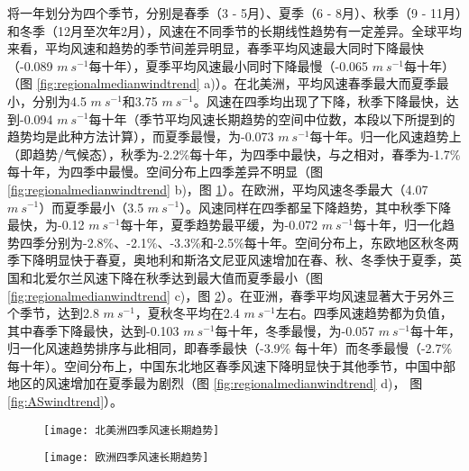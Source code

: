 将一年划分为四个季节，分别是春季（3 - 5月）、夏季（6 - 8月）、秋季（9 - 11月）和冬季（12月至次年2月），风速在不同季节的长期线性趋势有一定差异。全球平均来看，平均风速和趋势的季节间差异明显，春季平均风速最大同时下降最快（-0.089 $m ~ s^{-1}$每十年），夏季平均风速最小同时下降最慢（-0.065 $m ~ s^{-1}$每十年）（图 \ref{fig:regionalmedianwindtrend} a)）。在北美洲，平均风速春季最大而夏季最小，分别为4.5 $m ~ s^{-1}$和3.75 $m ~ s^{-1}$。风速在四季均出现了下降，秋季下降最快，达到-0.094 $m ~ s^{-1}$每十年（季节平均风速长期趋势的空间中位数，本段以下所提到的趋势均是此种方法计算），而夏季最慢，为-0.073 $m ~ s^{-1}$每十年。归一化风速趋势上（即趋势/气候态），秋季为-2.2\%每十年，为四季中最快，与之相对，春季为-1.7\%每十年，为四季中最慢。空间分布上四季差异不明显（图 \ref{fig:regionalmedianwindtrend} b)，图 \ref{fig:NAwindtrend}）。在欧洲，平均风速冬季最大（4.07 $m ~ s^{-1}$）而夏季最小（3.5 $m ~ s^{-1}$）。风速同样在四季都呈下降趋势，其中秋季下降最快，为-0.12 $m ~ s^{-1}$每十年，夏季趋势最平缓，为-0.072 $m ~ s^{-1}$每十年，归一化趋势四季分别为-2.8\%、-2.1\%、-3.3\%和-2.5\%每十年。空间分布上，东欧地区秋冬两季下降明显快于春夏，奥地利和斯洛文尼亚风速增加在春、秋、冬季快于夏季，英国和北爱尔兰风速下降在秋季达到最大值而夏季最小（图 \ref{fig:regionalmedianwindtrend} c)，图 \ref{fig:EUwindtrend}）。在亚洲，春季平均风速显著大于另外三个季节，达到2.8 $m ~ s^{-1}$，夏秋冬平均在2.4 $m ~ s^{-1}$左右。四季风速趋势都为负值，其中春季下降最快，达到-0.103 $m ~ s^{-1}$每十年，冬季最慢，为-0.057 $m ~ s^{-1}$每十年，归一化风速趋势排序与此相同，即春季最快（-3.9\% 每十年）而冬季最慢（-2.7\% 每十年）。空间分布上，中国东北地区春季风速下降明显快于其他季节，中国中部地区的风速增加在夏季最为剧烈（图 \ref{fig:regionalmedianwindtrend} d)， 图 \ref{fig:ASwindtrend}）。


\begin{figure}[!htbp]
    \centering
    \texttt{[image: 北美洲四季风速长期趋势]}
    \label{fig:NAwindtrend}
\end{figure}

\begin{figure}[!htbp]
    \centering
    \texttt{[image: 欧洲四季风速长期趋势]}
    \label{fig:EUwindtrend}
\end{figure}

